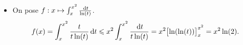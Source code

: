 \begin{itemize}
    \item On pose $f:x \mapsto \int_{x}^{x^2} \frac{\, \mathrm{d} t}{\ln (t)}$.
    $$\displaystyle f(x) = \int_{x}^{x^2} \frac{t}{t \ln (t)} \, \mathrm{d} t \leqslant x^2 \int_{x}^{x^2} \frac{\, \mathrm{d} t}{t \ln(t)} = x^2 \bigl[ \ln (\ln (t)) \bigr]_x^{x^2} = x^2 \ln(2).$$
\end{itemize}